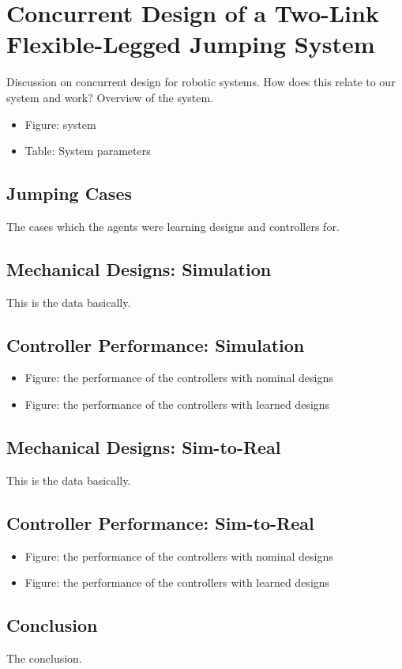 \chapter{Concurrent Design of a Two-Link Flexible-Legged Jumping System}
\label{chapter6}

Discussion on concurrent design for robotic systems. How does this relate to our system and work? Overview of the system.

\begin{itemize}
    \item Figure: system
    \item Table: System parameters
\end{itemize}

\section{Jumping Cases}
The cases which the agents were learning designs and controllers for. 

\section{Mechanical Designs: Simulation}

This is the data basically.

\section{Controller Performance: Simulation}
\begin{itemize}
    \item Figure: the performance of the controllers with nominal designs
    \item Figure: the performance of the controllers with learned designs
\end{itemize}

\section{Mechanical Designs: Sim-to-Real}

This is the data basically.

\section{Controller Performance: Sim-to-Real}
\begin{itemize}
    \item Figure: the performance of the controllers with nominal designs
    \item Figure: the performance of the controllers with learned designs
\end{itemize}

\section{Conclusion}
The conclusion.
